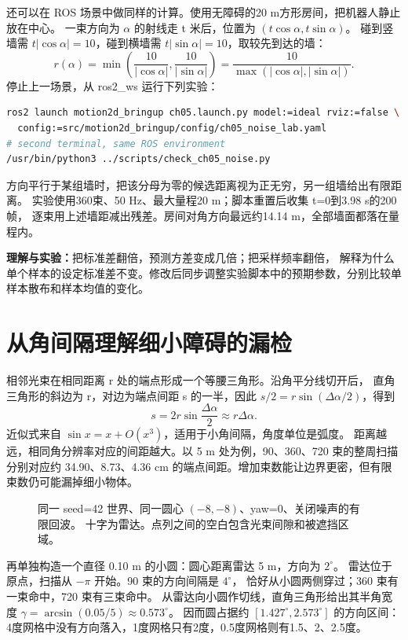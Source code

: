 还可以在 ROS 场景中做同样的计算。使用无障碍的20 m方形房间，把机器人静止放在中心。
一束方向为 $\alpha$ 的射线走 t 米后，位置为 $(t\cos\alpha,t\sin\alpha)$。
碰到竖墙需 $t|\cos\alpha|=10$，碰到横墙需 $t|\sin\alpha|=10$，取较先到达的墙：
\begin{equation}
r(\alpha)=\min\left(\frac{10}{|\cos\alpha|},\frac{10}{|\sin\alpha|}\right)
=\frac{10}{\max(|\cos\alpha|,|\sin\alpha|)}.
\end{equation}
停止上一场景，从 ros2\_ws 运行下列实验：
\begin{lstlisting}[language=bash,numbers=none]
ros2 launch motion2d_bringup ch05.launch.py model:=ideal rviz:=false \
  config:=src/motion2d_bringup/config/ch05_noise_lab.yaml
# second terminal, same ROS environment
/usr/bin/python3 ../scripts/check_ch05_noise.py
\end{lstlisting}
方向平行于某组墙时，把该分母为零的候选距离视为正无穷，另一组墙给出有限距离。
实验使用360束、50 Hz、最大量程20 m；脚本重置后收集 t=0到3.98 s的200帧，
逐束用上述墙距减出残差。房间对角方向最远约14.14 m，全部墙面都落在量程内。

\textbf{理解与实验：}把标准差翻倍，预测方差变成几倍；把采样频率翻倍，
解释为什么单个样本的设定标准差不变。修改后同步调整实验脚本中的预期参数，分别比较单样本散布和样本均值的变化。

\section{从角间隔理解细小障碍的漏检}
相邻光束在相同距离 r 处的端点形成一个等腰三角形。沿角平分线切开后，
直角三角形的斜边为 r，对边为端点间距 s 的一半，因此 $s/2=r\sin(\Delta\alpha/2)$，得到
\begin{equation}
s=2r\sin\frac{\Delta\alpha}{2}\approx r\Delta\alpha.
\end{equation}
近似式来自 $\sin x=x+O(x^3)$，适用于小角间隔，角度单位是弧度。
距离越远，相同角分辨率对应的间距越大。以 5 m 处为例，90、360、720 束的整周扫描
分别对应约 34.90、8.73、4.36 cm 的端点间距。增加束数能让边界更密，但有限束数仍可能漏掉细小物体。

\begin{figure}[ht]
\centering

\caption{同一 seed=42 世界、同一圆心 $(-8,-8)$、yaw=0、关闭噪声的有限回波。
十字为雷达。点列之间的空白包含光束间隙和被遮挡区域。}
\end{figure}

再单独构造一个直径 0.10 m 的小圆：圆心距离雷达 5 m，方向为 $2^\circ$。
雷达位于原点，扫描从 $-\pi$ 开始。90 束的方向间隔是 $4^\circ$，
恰好从小圆两侧穿过；360 束有一束命中，720 束有三束命中。
从雷达向小圆作切线，直角三角形给出其半角宽度
$\gamma=\arcsin(0.05/5)\approx0.573^\circ$。
因而圆占据约 $[1.427^\circ,2.573^\circ]$ 的方向区间：
4度网格中没有方向落入，1度网格只有2度，0.5度网格则有1.5、2、2.5度。

